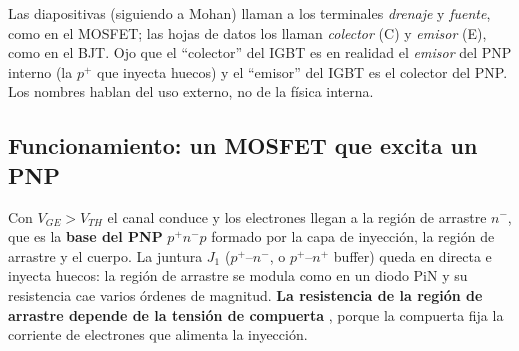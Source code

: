 \begin{ojo}
Las diapositivas (siguiendo a Mohan) llaman a los terminales \emph{drenaje} y \emph{fuente}, como en
el MOSFET; las hojas de datos los llaman \emph{colector} (C) y \emph{emisor} (E), como en el BJT. Ojo
que el ``colector'' del IGBT es en realidad el \emph{emisor} del PNP interno (la $p^+$ que inyecta
huecos) y el ``emisor'' del IGBT es el colector del PNP. Los nombres hablan del uso externo, no de la
física interna.
\end{ojo}

\subsection{Funcionamiento: un MOSFET que excita un PNP}

Con $V_{GE}>V_{TH}$ el canal conduce y los electrones llegan a la región de arrastre $n^-$, que es la
\textbf{base del PNP} $p^+n^-p$ formado por la capa de inyección, la región de arrastre y el cuerpo.
La juntura $J_1$ ($p^+$--$n^-$, o $p^+$--$n^+$ buffer) queda en directa e inyecta huecos: la región
de arrastre se modula como en un diodo PiN y su resistencia cae varios órdenes de magnitud.
\textbf{La resistencia de la región de arrastre depende de la tensión de compuerta} ,
porque la compuerta fija la corriente de electrones que alimenta la inyección.

